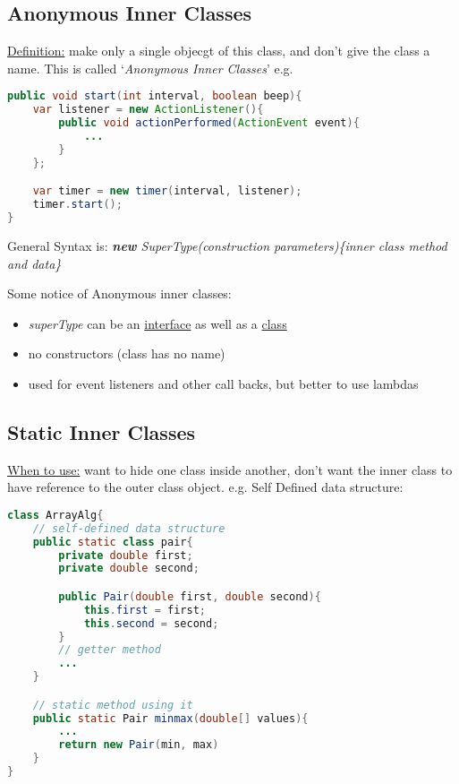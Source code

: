 \documentclass[12pt]{article}
\begin{document}
\subsection{Anonymous Inner Classes}
\underline{Definition:} make only a single objecgt of this class, and don't give the class a name.
This is called `\emph{Anonymous Inner Classes}'\newline
e.g.
\begin{lstlisting}[language=Java]
public void start(int interval, boolean beep){
    var listener = new ActionListener(){
        public void actionPerformed(ActionEvent event){
            ...
        }
    };

    var timer = new timer(interval, listener);
    timer.start();
}
\end{lstlisting}

General Syntax is:\newline
\emph{\textbf{new} SuperType(construction parameters)\{inner class method and data\}}

Some notice of Anonymous inner classes:
\begin{itemize}
    \item \emph{superType} can be an \underline{interface} as well as a \underline{class}
    \item no constructors (class has no name)
    \item used for event listeners and other call backs, but better to use lambdas
\end{itemize}

\subsection{Static Inner Classes}
\underline{When to use:} want to hide one class inside another, don't want the inner class to have
reference to the outer class object.\newline
e.g. Self Defined data structure:
\begin{lstlisting}[language=Java]
class ArrayAlg{
    // self-defined data structure
    public static class pair{
        private double first;
        private double second;

        public Pair(double first, double second){
            this.first = first;
            this.second = second;
        }
        // getter method
        ... 
    }

    // static method using it
    public static Pair minmax(double[] values){
        ... 
        return new Pair(min, max)
    }
}
\end{lstlisting}
\end{document}
